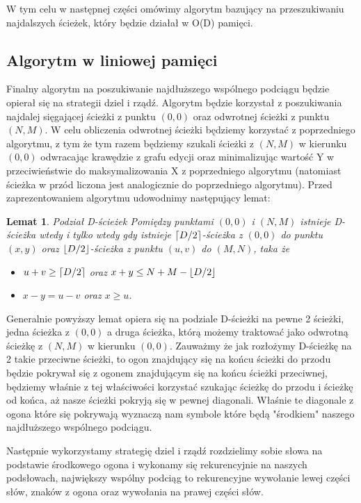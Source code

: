 \documentclass[12pt]{article}
\DeclarePairedDelimiter\ceil{\lceil}{\rceil}
\DeclarePairedDelimiter\floor{\lfloor}{\rfloor}
\newtheorem*{lemma}{Lemat}
\begin{document}
W tym celu w następnej części omówimy algorytm bazujący na przeszukiwaniu najdalszych ścieżek, który będzie działał w O(D) pamięci.

\subsection{Algorytm w liniowej pamięci}

Finalny algorytm na poszukiwanie najdłuższego wspólnego podciągu będzie opierał się na strategii dziel i rządź. Algorytm będzie korzystał z poszukiwania najdalej sięgającej ścieżki z punktu $(0,0)$ oraz odwrotnej ścieżki z punktu $(N,M)$. W celu obliczenia odwrotnej ścieżki będziemy korzystać z poprzedniego algorytmu, z tym że tym razem będziemy szukali ścieżki z $(N,M)$ w kierunku $(0,0)$ odwracając krawędzie z grafu edycji oraz minimalizując wartość Y w przeciwieństwie do maksymalizowania X z poprzedniego algorytmu (natomiast ścieżka w przód liczona jest analogicznie do poprzedniego algorytmu). Przed zaprezentowaniem algorytmu udowodnimy następujący lemat:

\begin{lemma}{Podział D-ścieżek}
Pomiędzy punktami $(0,0)$ i $(N, M)$ istnieje D-ścieżka wtedy i tylko wtedy gdy istnieje $\ceil*{D/2}$-ścieżka z $(0,0)$ do punktu $(x,y)$ oraz $\floor*{D/2}$-ścieżka z punktu $(u,v)$ do $(M,N)$, taka że
\begin{itemize}
    \item $u+v \geq \ceil*{D/2}$ oraz $x+y \leq N + M - \floor*{D/2}$
    \item $x-y = u-v$ oraz $x \geq u$.
\end{itemize}
\end{lemma}

Generalnie powyższy lemat opiera się na podziale D-ścieżki na pewne 2 ścieżki, jedna ścieżka z $(0,0)$ a druga ścieżka, którą możemy traktować jako odwrotną ścieżkę z $(N,M)$ w kierunku $(0,0)$. Zauważmy że jak rozłożymy D-ścieżkę na 2 takie przeciwne ścieżki, to ogon znajdujący się na końcu ścieżki do przodu będzie pokrywał się z ogonem znajdującym się na końcu ścieżki przeciwnej, będziemy właśnie z tej właściwości korzystać szukając ścieżkę do przodu i ścieżkę od końca, aż nasze ścieżki pokryją się w pewnej diagonali. Właśnie te diagonale z ogona które się pokrywają wyznaczą nam symbole które będą "środkiem" naszego najdłuższego wspólnego podciągu. 

Następnie wykorzystamy strategię dziel i rządź rozdzielimy sobie słowa na podstawie środkowego ogona i wykonamy się rekurencyjnie na naszych podsłowach, największy wspólny podciąg to rekurencyjne wywołanie lewej części słów, znaków z ogona oraz wywołania na prawej części słów.
\end{document}
